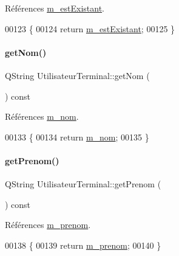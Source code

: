 Références \hyperlink{class_utilisateur_terminal_a6b16983fcb2b0f1f698f595309a67828}{m\+\_\+est\+Existant}.


\begin{DoxyCode}
00123 \{
00124     \textcolor{keywordflow}{return} \hyperlink{class_utilisateur_terminal_a6b16983fcb2b0f1f698f595309a67828}{m\_estExistant};
00125 \}
\end{DoxyCode}
\mbox{\label{class_utilisateur_terminal_a6432e5c3b9a732ef9312f67718648bf1}} 
\paragraph{\texorpdfstring{get\+Nom()}{getNom()}}
{\footnotesize\ttfamily Q\+String Utilisateur\+Terminal\+::get\+Nom (\begin{DoxyParamCaption}{ }\end{DoxyParamCaption}) const}



Références \hyperlink{class_utilisateur_terminal_a4b48835dcadacd5e7d5c9662b70cdc7d}{m\+\_\+nom}.


\begin{DoxyCode}
00133 \{
00134     \textcolor{keywordflow}{return} \hyperlink{class_utilisateur_terminal_a4b48835dcadacd5e7d5c9662b70cdc7d}{m\_nom};
00135 \}
\end{DoxyCode}
\mbox{\label{class_utilisateur_terminal_ac38fe2414a0dcb53d0f283f231dcba01}} 
\paragraph{\texorpdfstring{get\+Prenom()}{getPrenom()}}
{\footnotesize\ttfamily Q\+String Utilisateur\+Terminal\+::get\+Prenom (\begin{DoxyParamCaption}{ }\end{DoxyParamCaption}) const}



Références \hyperlink{class_utilisateur_terminal_a6dc3be09e844fc14aafec8019a1e2a5e}{m\+\_\+prenom}.


\begin{DoxyCode}
00138 \{
00139     \textcolor{keywordflow}{return} \hyperlink{class_utilisateur_terminal_a6dc3be09e844fc14aafec8019a1e2a5e}{m\_prenom};
00140 \}
\end{DoxyCode}
\mbox{\label{class_utilisateur_terminal_a196420ecc14bc0645e3e1c66d796b8e6}} 
